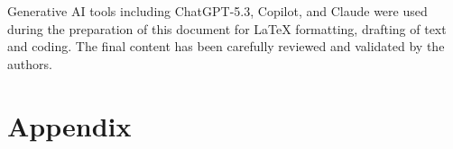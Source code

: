 \documentclass[a4paper,10pt]{article}
\begin{document}
Generative AI tools including ChatGPT-5.3, Copilot, and Claude were used during the preparation of this document for LaTeX formatting, drafting of text and coding. The final content has been carefully reviewed and validated by the authors.


\vspace{-5pt}
\footnotesize{

}


%











\appendix
\section{Appendix}
\end{document}
